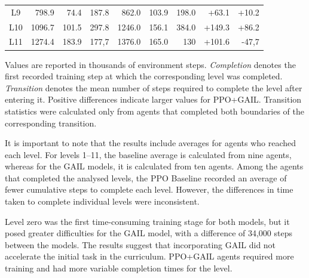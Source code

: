 \begin{table}[H]
\begin{tabular}{c rrr rrr rr}
		L9  & 798.9  & 74.4  & 187.8
		& 862.0  & 103.9 & 198.0
		& +63.1  & +10.2 \\ 
		
		L10 & 1096.7 & 101.5 & 297.8
		& 1246.0 & 156.1 & 384.0
		& +149.3 & +86.2 \\ 
		
		L11 & 1274.4 & 183.9 & 177,7
		& 1376.0 & 165.0 & 130
		& +101.6 & -47,7 \\
		\bottomrule
	\end{tabular}
	
	\vspace{0.2cm}
\end{table}
	Values are reported in thousands of environment steps. \textit{Completion} denotes the first recorded training step at which the corresponding level was completed. \textit{Transition} denotes the mean number of steps required to complete the level after entering it. Positive differences indicate larger values for PPO+GAIL. Transition statistics were calculated only from agents that completed both boundaries of the corresponding transition.

It is important to note that the results include averages for agents who reached each level. For levels 1–11, the baseline average is calculated from nine agents, whereas for the GAIL models, it is calculated from ten agents.
Among the agents that completed the analysed levels, the PPO Baseline recorded an average of fewer cumulative steps to complete each level. However, the differences in time taken to complete individual levels were inconsistent.

Level zero was the first time-consuming training stage for both models, but it posed greater difficulties for the GAIL model, with a difference of 34,000 steps between the models. The results suggest that incorporating GAIL did not accelerate the initial task in the curriculum. PPO+GAIL agents required more training and had more variable completion times for the level.

